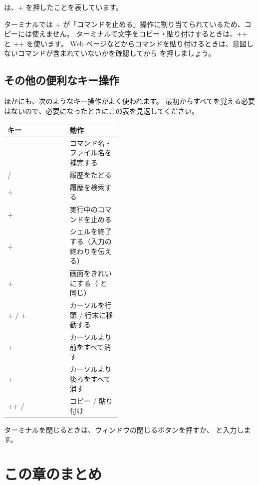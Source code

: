 \begin{terminal}[コマンドの基本形]
 は、+ を押したことを表しています。

\begin{caution}
  ターミナルでは + が「コマンドを止める」操作に割り当てられているため、コピーには使えません。
  ターミナルで文字をコピー・貼り付けするときは、++ と ++ を使います。
  Web ページなどからコマンドを貼り付けるときは、意図しないコマンドが含まれていないかを確認してから  を押しましょう。
\end{caution}

\subsection{その他の便利なキー操作}

ほかにも、次のようなキー操作がよく使われます。
最初からすべてを覚える必要はないので、必要になったときにこの表を見返してください。

\begin{center}
  \begin{tabular}{lp{0.45\linewidth}}
    \toprule
    キー & 動作 \\
    \midrule
    \key{Tab} & コマンド名・ファイル名を補完する \\
    \key{\(\uparrow\)} / \key{\(\downarrow\)} & 履歴をたどる \\
    \key{Ctrl}+\key{R} & 履歴を検索する \\
    \key{Ctrl}+\key{C} & 実行中のコマンドを止める \\
    \key{Ctrl}+\key{D} & シェルを終了する（入力の終わりを伝える） \\
    \key{Ctrl}+\key{L} & 画面をきれいにする（\cmd{clear} と同じ） \\
    \key{Ctrl}+\key{A} / \key{Ctrl}+\key{E} & カーソルを行頭 / 行末に移動する \\
    \key{Ctrl}+\key{U} & カーソルより前をすべて消す \\
    \key{Ctrl}+\key{K} & カーソルより後ろをすべて消す \\
    \key{Ctrl}+\key{Shift}+\key{C} / \key{V} & コピー / 貼り付け \\
    \bottomrule
  \end{tabular}
\end{center}

ターミナルを閉じるときは、ウィンドウの閉じるボタンを押すか、 と入力します。

\section*{この章のまとめ}


\end{terminal}
